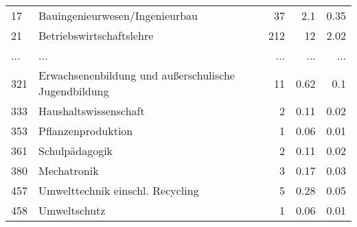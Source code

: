 \begin{longtable}{lXrrr}
        17 & \multicolumn{1}{X}{Bauingenieurwesen/Ingenieurbau} & %
          \num{37} &
          \num[round-mode=places,round-precision=2]{2.1} &
          \num[round-mode=places,round-precision=2]{0.35} \\
        21 & \multicolumn{1}{X}{Betriebswirtschaftslehre} & %
          \num{212} &
          \num[round-mode=places,round-precision=2]{12} &
          \num[round-mode=places,round-precision=2]{2.02} \\
       ... & ... & ... & ... & ... \\
        321 & \multicolumn{1}{X}{Erwachsenenbildung und außerschulische Jugendbildung} & %
          \num{11} &
          \num[round-mode=places,round-precision=2]{0.62} &
          \num[round-mode=places,round-precision=2]{0.1} \\

        333 & \multicolumn{1}{X}{Haushaltswissenschaft} & %
          \num{2} &
          \num[round-mode=places,round-precision=2]{0.11} &
          \num[round-mode=places,round-precision=2]{0.02} \\

        353 & \multicolumn{1}{X}{Pflanzenproduktion} & %
          \num{1} &
          \num[round-mode=places,round-precision=2]{0.06} &
          \num[round-mode=places,round-precision=2]{0.01} \\

        361 & \multicolumn{1}{X}{Schulpädagogik} & %
          \num{2} &
          \num[round-mode=places,round-precision=2]{0.11} &
          \num[round-mode=places,round-precision=2]{0.02} \\

        380 & \multicolumn{1}{X}{Mechatronik} & %
          \num{3} &
          \num[round-mode=places,round-precision=2]{0.17} &
          \num[round-mode=places,round-precision=2]{0.03} \\

        457 & \multicolumn{1}{X}{Umwelttechnik einschl. Recycling} & %
          \num{5} &
          \num[round-mode=places,round-precision=2]{0.28} &
          \num[round-mode=places,round-precision=2]{0.05} \\

        458 & \multicolumn{1}{X}{Umweltschutz} & %
          \num{1} &
          \num[round-mode=places,round-precision=2]{0.06} &
          \num[round-mode=places,round-precision=2]{0.01} \\


\end{longtable}
